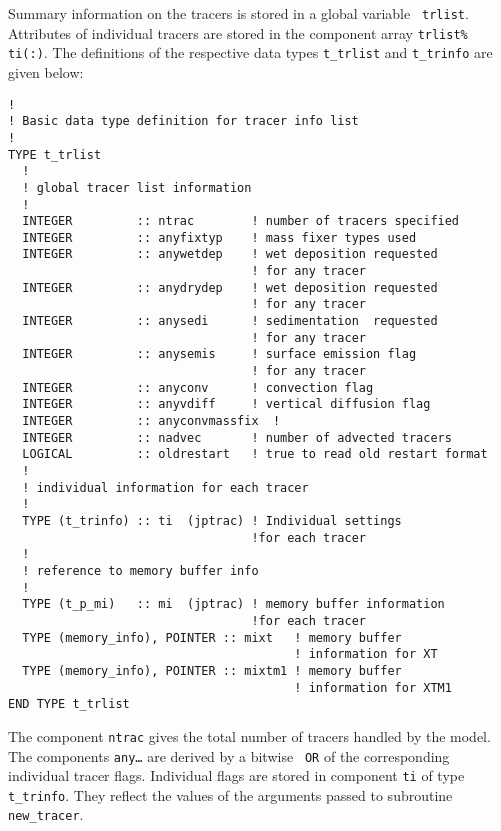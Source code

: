 Summary information on the tracers is stored in a global variable {\tt
trlist}. 
Attributes of individual tracers are stored in the component
array {\tt trlist\% ti(:)}. The definitions of the respective data
types {\tt t\_trlist} 
and {\tt t\_trinfo} are given below:
\begin{lstlisting}[caption=t\_trlist]
!
! Basic data type definition for tracer info list
!
TYPE t_trlist
  !
  ! global tracer list information
  !
  INTEGER         :: ntrac        ! number of tracers specified
  INTEGER         :: anyfixtyp    ! mass fixer types used
  INTEGER         :: anywetdep    ! wet deposition requested
                                  ! for any tracer
  INTEGER         :: anydrydep    ! wet deposition requested 
                                  ! for any tracer
  INTEGER         :: anysedi      ! sedimentation  requested 
                                  ! for any tracer
  INTEGER         :: anysemis     ! surface emission flag 
                                  ! for any tracer
  INTEGER         :: anyconv      ! convection flag
  INTEGER         :: anyvdiff     ! vertical diffusion flag
  INTEGER         :: anyconvmassfix  ! 
  INTEGER         :: nadvec       ! number of advected tracers
  LOGICAL         :: oldrestart   ! true to read old restart format
  !
  ! individual information for each tracer
  !
  TYPE (t_trinfo) :: ti  (jptrac) ! Individual settings 
                                  !for each tracer
  !
  ! reference to memory buffer info
  !
  TYPE (t_p_mi)   :: mi  (jptrac) ! memory buffer information 
                                  !for each tracer
  TYPE (memory_info), POINTER :: mixt   ! memory buffer 
                                        ! information for XT
  TYPE (memory_info), POINTER :: mixtm1 ! memory buffer 
                                        ! information for XTM1
END TYPE t_trlist
\end{lstlisting}
%
The component {\tt ntrac} 
gives the total number of tracers handled by
the model. The components {\tt any\dots} are derived by a bitwise {\tt
OR} of the corresponding individual tracer flags. Individual flags are
stored in component {\tt ti} of type {\tt
  t\_trinfo}. 
They reflect the
values of the arguments passed to subroutine {\tt
  new\_tracer}.
%
